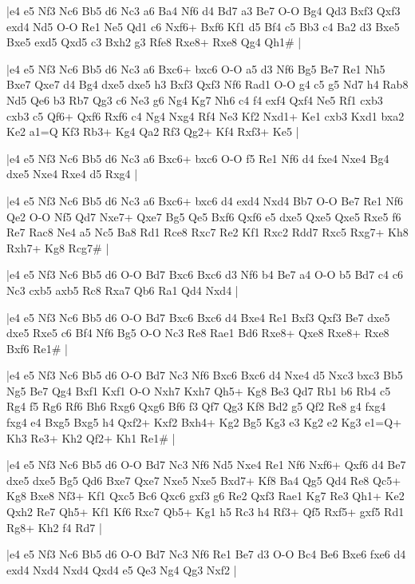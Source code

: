 \whitename{}
\blackname{}
\makegametitle
|e4 e5 Nf3 Nc6 Bb5 d6 Nc3 a6 Ba4 Nf6 d4 Bd7 a3 Be7 O-O Bg4 Qd3 Bxf3 Qxf3 exd4 Nd5 O-O Re1 Ne5 Qd1 c6 Nxf6+ Bxf6 Kf1 d5 Bf4 c5 Bb3 c4 Ba2 d3 Bxe5 Bxe5 exd5 Qxd5 c3 Bxh2 g3 Rfe8 Rxe8+ Rxe8 Qg4 Qh1\#  |

\whitename{}
\blackname{}
\makegametitle
|e4 e5 Nf3 Nc6 Bb5 d6 Nc3 a6 Bxc6+ bxc6 O-O a5 d3 Nf6 Bg5 Be7 Re1 Nh5 Bxe7 Qxe7 d4 Bg4 dxe5 dxe5 h3 Bxf3 Qxf3 Nf6 Rad1 O-O g4 c5 g5 Nd7 h4 Rab8 Nd5 Qe6 b3 Rb7 Qg3 c6 Ne3 g6 Ng4 Kg7 Nh6 c4 f4 exf4 Qxf4 Ne5 Rf1 cxb3 cxb3 c5 Qf6+ Qxf6 Rxf6 c4 Ng4 Nxg4 Rf4 Ne3 Kf2 Nxd1+ Ke1 cxb3 Kxd1 bxa2 Ke2 a1=Q Kf3 Rb3+ Kg4 Qa2 Rf3 Qg2+ Kf4 Rxf3+ Ke5  |

\whitename{}
\blackname{}
\makegametitle
|e4 e5 Nf3 Nc6 Bb5 d6 Nc3 a6 Bxc6+ bxc6 O-O f5 Re1 Nf6 d4 fxe4 Nxe4 Bg4 dxe5 Nxe4 Rxe4 d5 Rxg4  |

\whitename{}
\blackname{}
\makegametitle
|e4 e5 Nf3 Nc6 Bb5 d6 Nc3 a6 Bxc6+ bxc6 d4 exd4 Nxd4 Bb7 O-O Be7 Re1 Nf6 Qe2 O-O Nf5 Qd7 Nxe7+ Qxe7 Bg5 Qe5 Bxf6 Qxf6 e5 dxe5 Qxe5 Qxe5 Rxe5 f6 Re7 Rac8 Ne4 a5 Nc5 Ba8 Rd1 Rce8 Rxc7 Re2 Kf1 Rxc2 Rdd7 Rxc5 Rxg7+ Kh8 Rxh7+ Kg8 Rcg7\#  |

\whitename{}
\blackname{}
\makegametitle
|e4 e5 Nf3 Nc6 Bb5 d6 O-O Bd7 Bxc6 Bxc6 d3 Nf6 b4 Be7 a4 O-O b5 Bd7 c4 c6 Nc3 cxb5 axb5 Rc8 Rxa7 Qb6 Ra1 Qd4 Nxd4  |

\whitename{}
\blackname{}
\makegametitle
|e4 e5 Nf3 Nc6 Bb5 d6 O-O Bd7 Bxc6 Bxc6 d4 Bxe4 Re1 Bxf3 Qxf3 Be7 dxe5 dxe5 Rxe5 c6 Bf4 Nf6 Bg5 O-O Nc3 Re8 Rae1 Bd6 Rxe8+ Qxe8 Rxe8+ Rxe8 Bxf6 Re1\#  |

\whitename{}
\blackname{}
\makegametitle
|e4 e5 Nf3 Nc6 Bb5 d6 O-O Bd7 Nc3 Nf6 Bxc6 Bxc6 d4 Nxe4 d5 Nxc3 bxc3 Bb5 Ng5 Be7 Qg4 Bxf1 Kxf1 O-O Nxh7 Kxh7 Qh5+ Kg8 Be3 Qd7 Rb1 b6 Rb4 c5 Rg4 f5 Rg6 Rf6 Bh6 Rxg6 Qxg6 Bf6 f3 Qf7 Qg3 Kf8 Bd2 g5 Qf2 Re8 g4 fxg4 fxg4 e4 Bxg5 Bxg5 h4 Qxf2+ Kxf2 Bxh4+ Kg2 Bg5 Kg3 e3 Kg2 e2 Kg3 e1=Q+ Kh3 Re3+ Kh2 Qf2+ Kh1 Re1\#  |

\whitename{}
\blackname{}
\makegametitle
|e4 e5 Nf3 Nc6 Bb5 d6 O-O Bd7 Nc3 Nf6 Nd5 Nxe4 Re1 Nf6 Nxf6+ Qxf6 d4 Be7 dxe5 dxe5 Bg5 Qd6 Bxe7 Qxe7 Nxe5 Nxe5 Bxd7+ Kf8 Ba4 Qg5 Qd4 Re8 Qc5+ Kg8 Bxe8 Nf3+ Kf1 Qxc5 Bc6 Qxc6 gxf3 g6 Re2 Qxf3 Rae1 Kg7 Re3 Qh1+ Ke2 Qxh2 Re7 Qh5+ Kf1 Kf6 Rxc7 Qb5+ Kg1 h5 Rc3 h4 Rf3+ Qf5 Rxf5+ gxf5 Rd1 Rg8+ Kh2 f4 Rd7  |

\whitename{}
\blackname{}
\makegametitle
|e4 e5 Nf3 Nc6 Bb5 d6 O-O Bd7 Nc3 Nf6 Re1 Be7 d3 O-O Bc4 Be6 Bxe6 fxe6 d4 exd4 Nxd4 Nxd4 Qxd4 e5 Qe3 Ng4 Qg3 Nxf2  |


